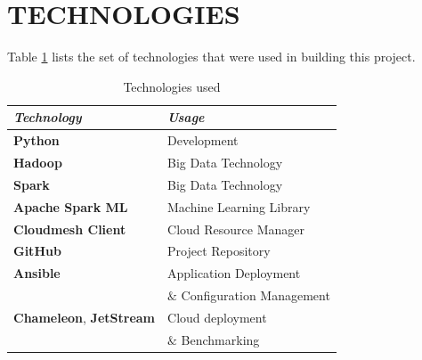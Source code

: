 \documentclass[9pt,twocolumn,twoside]{../../styles/osajnl}
\begin{document}
	
	
\section{TECHNOLOGIES}

	Table \ref{table:technologies} lists the set of technologies that were used in building this project.
	
	\begin{table}[h!]
		\centering
		\begin{tabular}[width=\linewidth]{|l l|}
			\hline
			\textit{Technology} & \textit{Usage}  \\  \hline
			\hline 
			\textbf{Python}\cite{www-python} & Development \\
			\hline
			\textbf{Hadoop}\cite{www-hadoop} & Big Data
			Technology  \\
			\textbf{Spark}\cite{www-spark} & Big Data Technology \\
			\hline
			\textbf{Apache Spark ML}\cite{www-Spark-ML} &
			Machine Learning Library \\
			\hline
			\textbf{Cloudmesh Client}\cite{Cloudmesh} &
			Cloud Resource Manager \\
			\hline		
			\textbf{GitHub}\cite{www-github} & Project Repository \\
			\hline
			\textbf{Ansible}\cite{www-ansible} & Application Deployment \\ & $\&$
			Configuration Management \\
			\hline
			\textbf{Chameleon}\cite{www-chameleon},
			\textbf{JetStream}\cite{www-jetstream} & Cloud deployment \\ & $\&$
			Benchmarking \\
			\hline
		\end{tabular}
		\caption{Technologies used}
		\label{table:technologies}
	\end{table}
\end{document}

